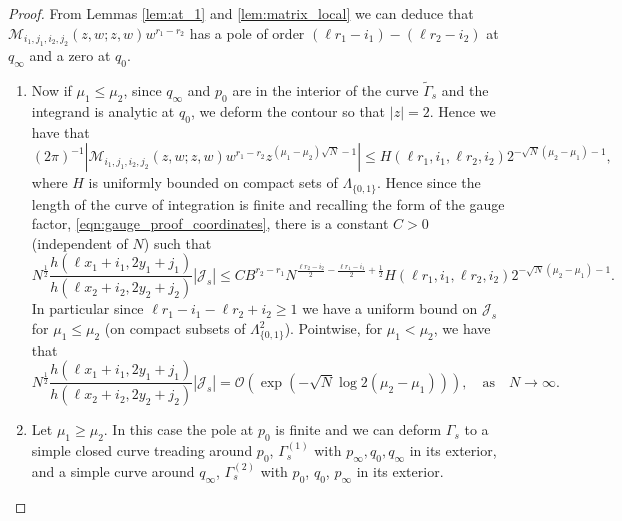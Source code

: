 \documentclass[11pt]{article}
\theoremstyle{plain}
\theoremstyle{definition}
\numberwithin{equation}{section}
\begin{document}
\begin{proof}
From Lemmas \ref{lem:at_1} and \ref{lem:matrix_local} we can deduce that
$\boldsymbol{\mathcal{M}}_{i_1,j_1,i_2,j_2}(z,w;z,w) 
w^{r_1-r_2}$
has a pole of order $(\ell r_1-i_1)-(\ell r_2-i_2)$ at $q_{\infty}$ and a zero at $q_0$.
\begin{enumerate}
\item
Now if $\mu_1 \leq \mu_2$, since $q_{\infty}$ and $p_0$ are in the interior of the curve $\tilde{\Gamma}_s$ and the integrand is analytic at $q_0$, we deform the contour so that $|z|=2$. Hence we have that 
\begin{equation}
(2\pi)^{-1}\left|\boldsymbol{\mathcal{M}}_{i_1,j_1,i_2,j_2}(z,w;z,w) 
w^{r_1-r_2}
z^{(\mu_1-\mu_2)\sqrt{N}-1}\right|
\leq H(\ell r_1, i_1, \ell r_2, i_2) 2^{-\sqrt{N}(\mu_2-\mu_1)-1}
,
\end{equation}
where $H$ is uniformly bounded on compact sets of $\Lambda_{\{0,1\}}$. 
Hence since the length of the curve of integration is finite and recalling the form of the gauge factor, \eqref{eqn:gauge_proof_coordinates},  
there is a constant $C>0$ (independent of $N$) such that
$$N^{\frac{1}{2}}
\frac{h(\ell x_1+i_1,2y_1+j_1)}{h(\ell x_2+i_2,2y_2+j_2)}  |\mathcal{J}_s|\leq 
 C B^{r_2-r_1} 
N^{\frac{\ell r_2-i_2}{2}-\frac{\ell r_1-i_1}{2}+\frac{1}{2}}
 H(\ell r_1, i_1, \ell r_2, i_2)  2^{-\sqrt{N}(\mu_2-\mu_1)-1}.
 $$
In particular since $\ell r_1-i_1-\ell r_2 +i_2 \geq 1$ we have a uniform bound on $\mathcal{J}_s$ for $\mu_1\leq \mu_2$ (on compact subsets of $\Lambda_{\{0,1\}}^2$). %
%
Pointwise, for $\mu_1<\mu_2$, we have that
\begin{equation}
N^{\frac{1}{2}}
\frac{h(\ell x_1+i_1,2y_1+j_1)}{h(\ell x_2+i_2,2y_2+j_2)}
 |\mathcal{J}_{s}|
=\mathcal{O}
\left(\exp\left(-\sqrt{N}\log 2(\mu_2-\mu_1)\right)\right), \quad \text{as}\quad N\rightarrow\infty.
\end{equation}
\item
Let $\mu_1\geq \mu_2$. In this case the pole at $p_0$ is finite and we can deform $\Gamma_s$ to a simple closed curve treading around $p_0$, $\Gamma_s^{(1)}$ with $p_{\infty}, q_{0}, q_{\infty}$ in its exterior, and a simple curve around $q_{\infty}$, $\Gamma_s^{(2)}$ with $p_0$, $q_0$, $p_{\infty}$ in its exterior. 


\end{enumerate}
\end{proof}
\end{document}
